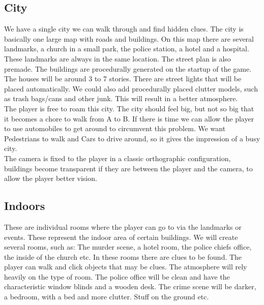 \documentclass{article}
\begin{document}
	\subsection{City}
		We have a single city we can walk through and find hidden clues. The city is basically one large map with roads and buildings. On this map there are several landmarks, a church in a small park, the police station, a hotel and a hospital. These landmarks are always in the same location. The street plan is also premade. The buildings are procedurally generated on the startup of the game. The houses will be around 3 to 7 stories. There are street lights that will be placed automatically. We could also add procedurally placed clutter models, such as trash bags/cans and other junk. This will result in a better atmosphere.\\
		The player is free to roam this city. The city should feel big, but not so big that it becomes a chore to walk from A to B. If there is time we can allow the player to use automobiles to get around to circumvent this problem. We want Pedestrians to walk and Cars to drive around, so it gives the impression of a busy city.\\
		The camera is fixed to the player in a classic orthographic configuration, buildings become transparent if they are between the player and the camera, to allow the player better vision.
	\subsection{Indoors}
		These are individual rooms where the player can go to via the landmarks or events. These represent the indoor area of certain buildings. We will create several rooms, such as: The murder scene, a hotel room, the police chiefs office, the inside of the church etc. In these rooms there are clues to be found. The player can walk and click objects that may be clues. The atmosphere will rely heavily on the type of room. The police office will be clean and have the characteristic window blinds and a wooden desk. The crime scene will be darker, a bedroom, with a bed and more clutter. Stuff on the ground etc.
\end{document}
